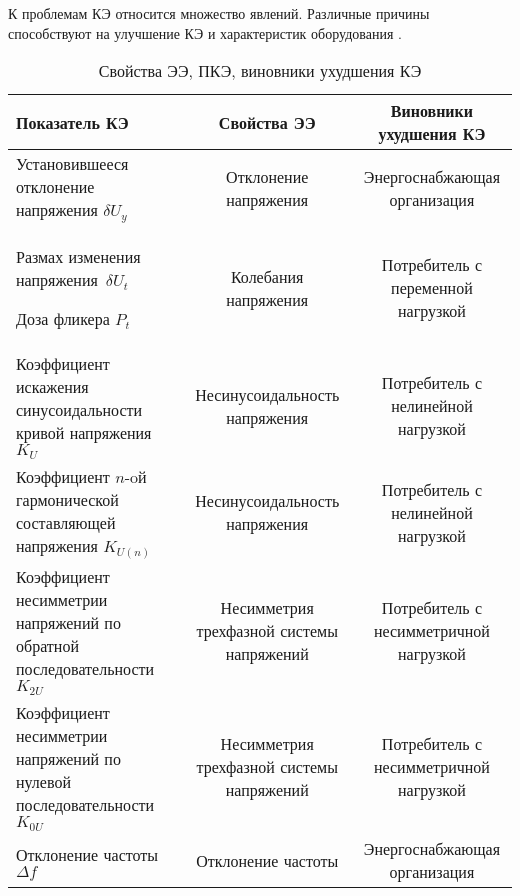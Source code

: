 К проблемам КЭ относится множество явлений. Различные причины способствуют на улучшение КЭ и характеристик оборудования \cite{ГОСТ13109-97}.

\begin{table} [p]%
	\caption{Свойства ЭЭ, ПКЭ, виновники ухудшения КЭ}%
	\label{tbl:test3}%
	\begin{SingleSpace}
		\setlength\extrarowheight{6pt} %
		\setlength{\tymin}{1.9cm}%
		\begin{tabulary}{\textwidth}{@{}>{\zz}L >{\zz}C >{\zz}C @{}}%
			\toprule     %
			Показатель КЭ & 
			Свойства ЭЭ &
			Виновники ухудшения КЭ \\
			\midrule %
			Установившееся отклонение напряжения ${\delta U_y}$ &
			Отклонение напряжения &
			Энергоснабжающая организация \\
			
			Размах изменения напряжения~${\delta U_t}$ 
			
			Доза фликера ${P_t}$ &
			Колебания напряжения &
			Потребитель с переменной нагрузкой \\
			
			Коэффициент искажения синусоидальности кривой напряжения ${K_U}$ &
			Несинусоидальность напряжения &
			Потребитель с нелинейной нагрузкой \\
			
			Коэффициент $n$-oй гармонической составляющей напряжения ${K_{U(n)}}$ &
			Несинусоидальность напряжения &
			Потребитель с нелинейной нагрузкой \\
			
			Коэффициент несимметрии напряжений по обратной последовательности ${K_{2U}}$ &
			Несимметрия трехфазной системы напряжений &
			Потребитель с несимметричной нагрузкой \\
			
			Коэффициент несимметрии напряжений по нулевой последовательности ${K_{0U}}$ &
			Несимметрия трехфазной системы напряжений &
			Потребитель с несимметричной нагрузкой \\
			
			Отклонение частоты ${\Delta f}$ &
			Отклонение частоты &
			Энергоснабжающая организация \\
			

\end{tabulary}
\end{SingleSpace}
\end{table}
